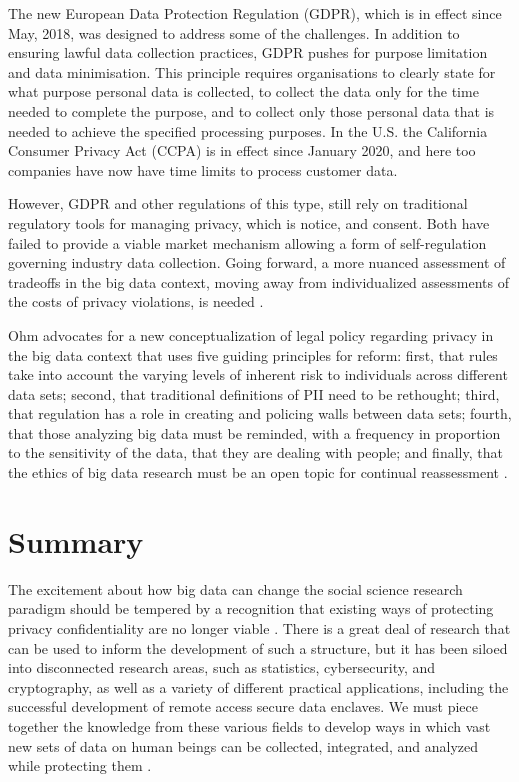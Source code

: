 \documentclass[]{krantz}
\begin{document}
The new European Data Protection Regulation (GDPR), which is in effect
since May, 2018, was designed to address some of the challenges. In
addition to ensuring lawful data collection practices, GDPR pushes for
purpose limitation and data minimisation. This principle requires
organisations to clearly state for what purpose personal data is
collected, to collect the data only for the time needed to complete the
purpose, and to collect only those personal data that is needed to
achieve the specified processing purposes. In the U.S. the California
Consumer Privacy Act (CCPA) is in effect since January 2020, and here
too companies have now have time limits to process customer data.

However, GDPR and other regulations of this type, still rely on
traditional regulatory tools for managing privacy, which is notice, and
consent. Both have failed to provide a viable market mechanism allowing
a form of self-regulation governing industry data collection. Going
forward, a more nuanced assessment of tradeoffs in the big data context,
moving away from individualized assessments of the costs of privacy
violations, is needed \citep{Strandburg2014}.

Ohm advocates for a new conceptualization of legal policy regarding
privacy in the big data context that uses five guiding principles for
reform: first, that rules take into account the varying levels of
inherent risk to individuals across different data sets; second, that
traditional definitions of PII need to be rethought; third, that
regulation has a role in creating and policing walls between data sets;
fourth, that those analyzing big data must be reminded, with a frequency
in proportion to the sensitivity of the data, that they are dealing with
people; and finally, that the ethics of big data research must be an
open topic for continual reassessment \citep{Ohm2014}.

\section{Summary}\label{summary-7}

The excitement about how big data can change the social science research
paradigm should be tempered by a recognition that existing ways of
protecting privacy confidentiality are no longer viable
\citep{karr2014analytical}. There is a great deal of research that can
be used to inform the development of such a structure, but it has been
siloed into disconnected research areas, such as statistics,
cybersecurity, and cryptography, as well as a variety of different
practical applications, including the successful development of remote
access secure data enclaves. We must piece together the knowledge from
these various fields to develop ways in which vast new sets of data on
human beings can be collected, integrated, and analyzed while protecting
them \citep{lane2014}.
\end{document}
